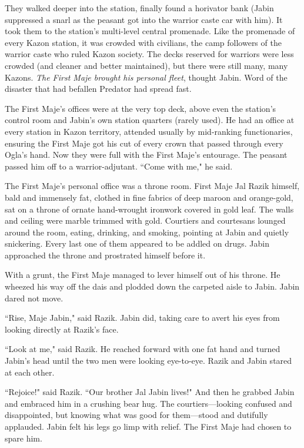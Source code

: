 \documentclass[twoside,letterpaper,12pt]{memoir}
\begin{document}
They walked deeper into the station, finally found a horivator bank (Jabin suppressed a snarl as the peasant got into the warrior caste car with him). It took them to the station's multi-level central promenade. Like the promenade of every Kazon station, it was crowded with civilians, the camp followers of the warrior caste who ruled Kazon society. The decks reserved for warriors were less crowded (and cleaner and better maintained), but there were still many, many Kazons. \textit{The First Maje brought his personal fleet}, thought Jabin. Word of the disaster that had befallen Predator had spread fast.

The First Maje's offices were at the very top deck, above even the station's control room and Jabin's own station quarters (rarely used). He had an office at every station in Kazon territory, attended usually by mid-ranking functionaries, ensuring the First Maje got his cut of every crown that passed through every Ogla's hand. Now they were full with the First Maje's entourage. The peasant passed him off to a warrior-adjutant. ``Come with me," he said.

The First Maje's personal office was a throne room. First Maje Jal Razik himself, bald and immensely fat, clothed in fine fabrics of deep maroon and orange-gold, sat on a throne of ornate hand-wrought ironwork covered in gold leaf. The walls and ceiling were marble trimmed with gold. Courtiers and courtesans lounged around the room, eating, drinking, and smoking, pointing at Jabin and quietly snickering. Every last one of them appeared to be addled on drugs. Jabin approached the throne and prostrated himself before it.

With a grunt, the First Maje managed to lever himself out of his throne. He wheezed his way off the dais and plodded down the carpeted aisle to Jabin. Jabin dared not move.

``Rise, Maje Jabin," said Razik. Jabin did, taking care to avert his eyes from looking directly at Razik's face.

``Look at me," said Razik. He reached forward with one fat hand and turned Jabin's head until the two men were looking eye-to-eye. Razik and Jabin stared at each other.

``Rejoice!" said Razik. ``Our brother Jal Jabin lives!" And then he grabbed Jabin and embraced him in a crushing bear hug. The courtiers---looking confused and disappointed, but knowing what was good for them---stood and dutifully applauded. Jabin felt his legs go limp with relief. The First Maje had chosen to spare him.
\end{document}
